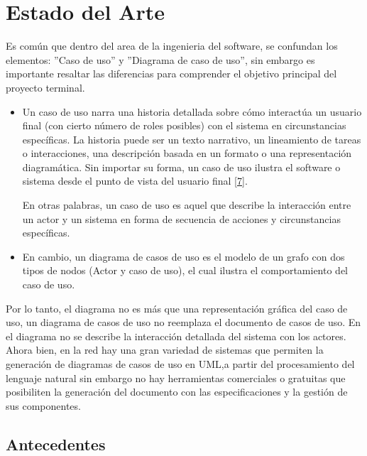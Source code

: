 \chapter{Estado del Arte}

	Es común que dentro del area de la ingenieria del software, se confundan los elementos: ''Caso de uso'' y ''Diagrama de caso de uso'', sin embargo es importante resaltar las diferencias para comprender el objetivo principal del proyecto terminal.
	
	 \begin{itemize}
	 	
	 	\item Un caso de uso narra una historia detallada sobre cómo interactúa un usuario final (con cierto número de roles posibles) con el sistema en circunstancias específicas. La historia puede ser un texto narrativo, un lineamiento de tareas o interacciones, una descripción basada en un formato o una representación diagramática. Sin importar su forma, un caso de uso ilustra el software o sistema desde el punto de vista del usuario final  \hyperlink{b07}{[7]}. 
	 

		En otras palabras, un caso de uso es aquel que describe la interacción entre un actor y un sistema en forma de secuencia de acciones y circunstancias específicas.
		
		\item En cambio, un diagrama de casos de uso es el modelo de un grafo con dos tipos de nodos (Actor y caso de uso), el cual ilustra el comportamiento del caso de uso.
	\end{itemize}

	Por lo tanto, el diagrama no es más que una representación gráfica del caso de uso, un diagrama de casos de uso no  reemplaza el documento de casos de uso. En el diagrama no se describe la interacción detallada del sistema con los actores.\\
	

	Ahora bien, en la red hay una gran variedad de sistemas que permiten la generación de diagramas de casos de uso en UML,a partir del procesamiento del lenguaje natural sin embargo no hay herramientas comerciales o gratuitas que posibiliten la generación del documento con las especificaciones y la gestión de sus componentes.
	

\section{Antecedentes}

